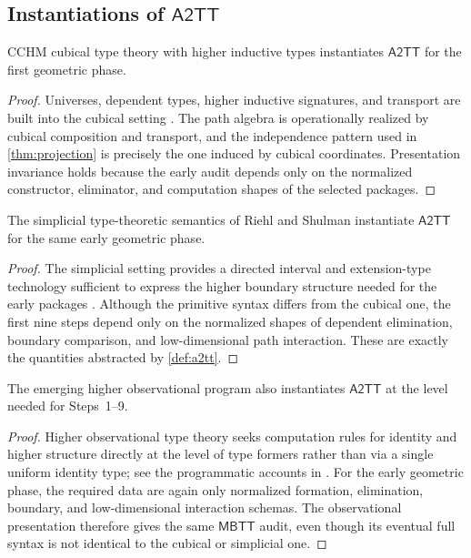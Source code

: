 \documentclass{lmcs}
\newcommand{\MBTT}{\mathsf{MBTT}}
\newcommand{\ATwoTT}{\mathsf{A2TT}}
\begin{document}
\subsection{Instantiations of \texorpdfstring{$\ATwoTT$}{A2TT}}

\begin{prop}
\label{prop:cubical-inst}
CCHM cubical type theory with higher inductive types instantiates $\ATwoTT$ for the first geometric phase.
\end{prop}

\begin{proof}
Universes, dependent types, higher inductive signatures, and transport are built into the cubical setting \cite{cubical,cchm-hits}. The path algebra is operationally realized by cubical composition and transport, and the independence pattern used in \autoref{thm:projection} is precisely the one induced by cubical coordinates. Presentation invariance holds because the early audit depends only on the normalized constructor, eliminator, and computation shapes of the selected packages.
\end{proof}

\begin{prop}
\label{prop:simplicial-inst}
The simplicial type-theoretic semantics of Riehl and Shulman instantiate $\ATwoTT$ for the same early geometric phase.
\end{prop}

\begin{proof}
The simplicial setting provides a directed interval and extension-type technology sufficient to express the higher boundary structure needed for the early packages \cite{riehl-shulman}. Although the primitive syntax differs from the cubical one, the first nine steps depend only on the normalized shapes of dependent elimination, boundary comparison, and low-dimensional path interaction. These are exactly the quantities abstracted by \autoref{def:a2tt}.
\end{proof}

\begin{prop}
\label{prop:observational-inst}
The emerging higher observational program also instantiates $\ATwoTT$ at the level needed for Steps~1--9.
\end{prop}

\begin{proof}
Higher observational type theory seeks computation rules for identity and higher structure directly at the level of type formers rather than via a single uniform identity type; see the programmatic accounts in \cite{aks-hott,altenkirch-param}. For the early geometric phase, the required data are again only normalized formation, elimination, boundary, and low-dimensional interaction schemas. The observational presentation therefore gives the same $\MBTT$ audit, even though its eventual full syntax is not identical to the cubical or simplicial one.
\end{proof}
\end{document}
